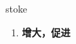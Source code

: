 
\begin{frame}
{\huge stoke}
\begin{center}
\begin{enumerate}\Large
  \item \textbf{增大，促进}
\end{enumerate}
\end{center}
\end{frame}

